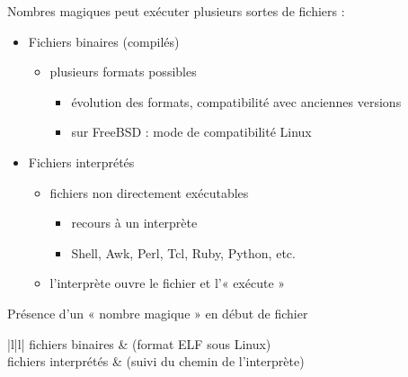 \begin {frame} {Nombres magiques}
     peut exécuter plusieurs sortes de fichiers :

    \begin {itemize}
	\item Fichiers binaires (compilés)
	    \begin {itemize}
		\item plusieurs formats possibles
		    \begin {itemize}
			\item évolution des formats,
			    compatibilité avec anciennes versions
			\item sur FreeBSD : mode de compatibilité Linux
		    \end {itemize}
	    \end {itemize}
	\item Fichiers interprétés
	    \begin {itemize}
		\item fichiers non directement exécutables
		    \begin {itemize}
			\item recours à un interprète
			\item Shell, Awk, Perl, Tcl, Ruby, Python, etc.
		    \end {itemize}
		\item l'interprète ouvre le fichier et l'« exécute »
	    \end {itemize}
    \end {itemize}

    \vspace* {1mm}

    Présence d'un « nombre magique » en début de fichier

    \ctableau {\fC} {|l|l|} {
	\rca fichiers binaires
	    &  (format ELF sous Linux) \\
	\rcb fichiers interprétés
	    &   (suivi du chemin de l'interprète) \\
    }

\end {frame}



